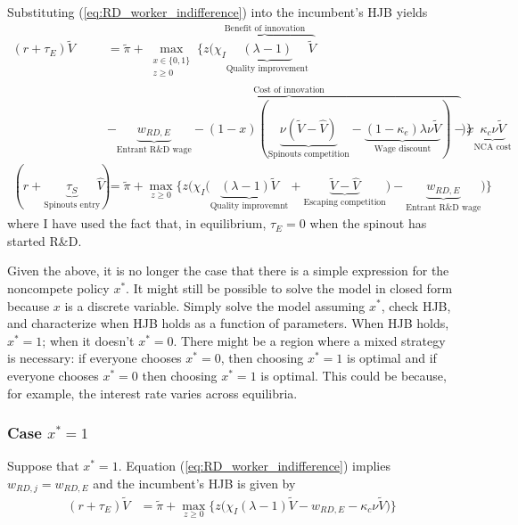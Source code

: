 \documentclass[12pt,english]{article}
\theoremstyle{remark}
\begin{document}
Substituting (\ref{eq:RD_worker_indifference}) into the incumbent's HJB yields
\begin{align}
	(r + \tau_E) \tilde{V} &= \tilde{\pi} + \max_{\substack{x \in \{0,1\} \\ z \ge 0}} \Big\{z \big(\overbrace{\chi_I \underbrace{(\lambda - 1)}_{\textrm{Quality improvement}} \tilde{V}}^{\textrm{Benefit of innovation}} \\
	&- \overbrace{   \underbrace{w_{RD,E}}_{\textrm{Entrant R\&D wage}} - (1-x) (\underbrace{\nu (\tilde{V}-\hat{V})}_{\textrm{Spinouts competition}} - \underbrace{(1-\kappa_{e})\lambda \nu \tilde{V} }_{\textrm{Wage discount}}) - x \underbrace{\kappa_{c} \nu \tilde{V}}_{\textrm{NCA cost}} }^{\textrm{Cost of innovation}} \big) \Big\} \label{eq:hjb_incumbent_workerIndiff} \\
	(r + \underbrace{\tau_S}_{\textrm{Spinouts entry}}) \hat{V} &= \tilde{\pi} + \max_{z \ge 0} \Big\{z \Big(\chi_I \big(\underbrace{(\lambda - 1) \tilde{V}}_{\textrm{Quality improvemnt}} + \underbrace{\tilde{V}- \hat{V}}_{\textrm{Escaping competition}}\big) - \underbrace{w_{RD,E}}_{\textrm{Entrant R\&D wage}}\Big) \Big\} \label{eq:hjb_incumbent_1_workerIndiff}
\end{align}
where I have used the fact that, in equilibrium, $\tau_E = 0$ when the spinout has started R\&D. 

Given the above, it is no longer the case that there is a simple expression for the noncompete policy $x^*$. It might still be possible to solve the model in closed form because $x$ is a discrete variable. Simply solve the model assuming $x^*$, check HJB, and characterize when HJB holds as a function of parameters. When HJB holds, $x^* = 1$; when it doesn't $x^* = 0$. There might be a region where a mixed strategy is necessary: if everyone chooses $x^* = 0$, then choosing $x^* = 1$ is optimal and if everyone chooses $x^* = 0$ then choosing $x^* = 1$ is optimal. This could be because, for example, the interest rate varies across equilibria.

\subsubsection{Case $x^* = 1$}

Suppose that $x^* = 1$. Equation (\ref{eq:RD_worker_indifference}) implies $w_{RD,j} = w_{RD,E}$ and the incumbent's HJB is given by 
\begin{align}
(r + \tau_E) \tilde{V} &= \tilde{\pi} + \max_{z \ge 0} \Big\{z \big(\chi_I (\lambda - 1) \tilde{V} - w_{RD,E} - \kappa_{c} \nu \tilde{V}\big) \Big\} \label{eq:hjb_incumbent}
\end{align}
\end{document}
